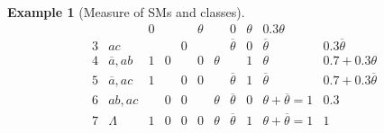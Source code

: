 \documentclass[a4paper]{article}
\newtheorem{example}{Example}
\newtheorem{example}{Example}
\newcommand{\co}[1]{\ensuremath{\overline{#1}}}     %
\newcommand{\bottomclass}{\ensuremath{\Lambda}}
\begin{document}
{\begin{example}[Measure of \aclp{SM} and classes]
\begin{equation*}
\begin{array}{c||l|ccc|ccc|c|c|r}
                &                                           & 0      &
                &                                           & \theta &
                & 0
                & \theta
                & 0.3\theta
              \\[2pt]
              3
                & ac
                &                                           &        & 0
                &                                           &        & \co{\theta}
                & 0
                & \co{\theta}
                & 0.3\co{\theta}
              \\[2pt]
              4
                & \co{a}, ab
                & 1                                         & 0      &
                & 0                                         & \theta &
                & 1
                & \theta
                & 0.7 + 0.3\theta
              \\[2pt]
              5
                & \co{a}, ac
                & 1                                         &        & 0
                & 0                                         &        & \co{\theta}
                & 1
                & \co{\theta}
                & 0.7 + 0.3\co{\theta}
              \\[2pt]
              6
                & ab, ac
                &                                           & 0      & 0
                &                                           & \theta & \co{\theta}
                & 0
                & \theta + \co{\theta} = 1
                & 0.3
              \\[2pt]
              7
                & \bottomclass
                & 1                                         & 0      & 0
                & 0                                         & \theta & \co{\theta}
                & 1
                & \theta + \co{\theta} = 1
                & 1
          \end{array}
      \end{equation*}


\end{example}}
\end{document}

